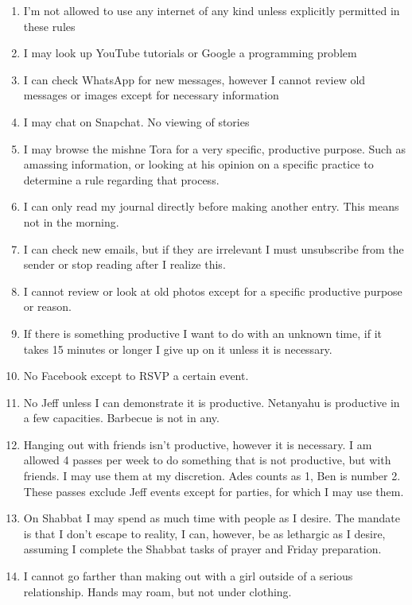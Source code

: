 \begin{enumerate}
\def\labelenumi{\arabic{enumi}.}
\item
  I'm not allowed to use any internet of any kind unless explicitly
  permitted in these rules
\item
  I may look up YouTube tutorials or Google a programming problem
\item
  I can check WhatsApp for new messages, however I cannot review old
  messages or images except for necessary information
\item
  I may chat on Snapchat. No viewing of stories
\item
  I may browse the mishne Tora for a very specific, productive purpose.
  Such as amassing information, or looking at his opinion on a specific
  practice to determine a rule regarding that process.
\item
  I can only read my journal directly before making another entry. This
  means not in the morning.
\item
  I can check new emails, but if they are irrelevant I must unsubscribe
  from the sender or stop reading after I realize this.
\item
  I cannot review or look at old photos except for a specific productive
  purpose or reason.
\item
  If there is something productive I want to do with an unknown time, if
  it takes 15 minutes or longer I give up on it unless it is necessary.
\item
  No Facebook except to RSVP a certain event.
\item
  No Jeff unless I can demonstrate it is productive. Netanyahu is
  productive in a few capacities. Barbecue is not in any.
\item
  Hanging out with friends isn't productive, however it is necessary. I
  am allowed 4 passes per week to do something that is not productive,
  but with friends. I may use them at my discretion. Ades counts as 1,
  Ben is number 2. These passes exclude Jeff events except for parties,
  for which I may use them.
\item
  On Shabbat I may spend as much time with people as I desire. The
  mandate is that I don't escape to reality, I can, however, be as
  lethargic as I desire, assuming I complete the Shabbat tasks of prayer
  and Friday preparation.
\item
  I cannot go farther than making out with a girl outside of a serious
  relationship. Hands may roam, but not under clothing.
\end{enumerate}

